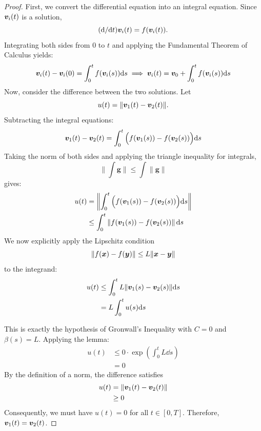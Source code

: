 \begin{proof}
First, we convert the differential equation into an integral equation. Since $\bm{v}_i(t)$ is a solution,
\[
(\mathrm{d}/\mathrm{d} t)\bm{v}_i(t) = f(\bm{v}_i(t)).
\]
Integrating both sides from $0$ to $t$ and applying the Fundamental Theorem of Calculus yields:
\begin{equation}
\bm{v}_i(t) - \bm{v}_i(0) = \int_0^t f(\bm{v}_i(s)) \mathrm{d} s \implies \bm{v}_i(t) = \bm{v}_0 + \int_0^t f(\bm{v}_i(s)) \mathrm{d} s
\end{equation}
Now, consider the difference between the two solutions. Let
\[
u(t) = \|\bm{v}_1(t) - \bm{v}_2(t)\|.
\]
Subtracting the integral equations:
\begin{equation}
\bm{v}_1(t) - \bm{v}_2(t) = \int_0^t \Big( f(\bm{v}_1(s)) - f(\bm{v}_2(s)) \Big) \mathrm{d} s
\end{equation}
Taking the norm of both sides and applying the triangle inequality for integrals,
\[
\|\int \mathbf{g}\| \leq \int \|\mathbf{g}\|
\]
gives:
\begin{equation}
\begin{aligned}
u(t) &= \left\| \int_0^t \Big( f(\bm{v}_1(s)) - f(\bm{v}_2(s)) \Big) \mathrm{d} s \right\| \\
&\leq \int_0^t \left\| f(\bm{v}_1(s)) - f(\bm{v}_2(s)) \right\| \mathrm{d} s
\end{aligned}
\end{equation}
We now explicitly apply the Lipschitz condition
\[
\|f(\bm{x}) - f(\bm{y})\| \leq L\|\bm{x} - \bm{y}\|
\]
to the integrand:
\begin{equation}
\begin{aligned}
u(t) &\leq \int_0^t L \|\bm{v}_1(s) - \bm{v}_2(s)\| \mathrm{d} s \\
&= L \int_0^t u(s) \mathrm{d} s
\end{aligned}
\end{equation}

This is exactly the hypothesis of Gronwall's Inequality with $C = 0$ and $\beta(s) = L$. Applying the lemma:
\begin{equation}
\begin{aligned}
u(t) &\leq 0 \cdot \exp\left( \int_0^t L \dd s \right) \\
&= 0
\end{aligned}
\end{equation}
By the definition of a norm, the difference satisfies
\[
\begin{aligned}
u(t) &= \|\bm{v}_1(t) - \bm{v}_2(t)\| \\
&\geq 0
\end{aligned}
\]
Consequently, we must have $u(t) = 0$ for all $t \in [0, T]$. Therefore, $\bm{v}_1(t) = \bm{v}_2(t)$.
\end{proof}

